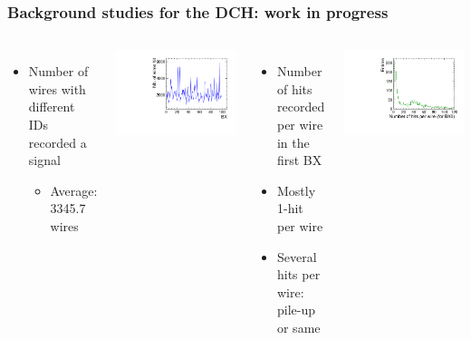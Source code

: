 \documentclass[aspectratio=169, hyperref={colorlinks=true,pdfpagelabels=false,linkcolor=black}, xcolor=dvipsnames,10pt]{beamer}
\begin{document}
\begin{frame}
	\frametitle{Background studies for the DCH: work in progress}

	\begin{columns}[t]
		\begin{itemize}
		\item Number of wires with different IDs recorded a signal
			\begin{itemize}
			\item Average: 3345.7 wires
			\end{itemize}
		\end{itemize}
	
		\centering
		\includegraphics[width=\textwidth]{../figures/DCH/differentWires_hit_perBX.pdf}
	

		
		\begin{itemize}
		\item Number of hits recorded per wire in the first BX
		\item Mostly 1-hit per wire
		\item Several hits per wire: pile-up or same 
		\end{itemize}
		\centering
		\includegraphics[width=\textwidth]{../figures/DCH/nb_hits_per_wire.pdf}
		

\end{columns}
\end{frame}
\end{document}
